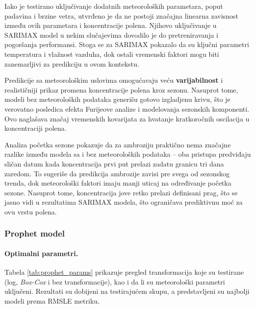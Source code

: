\documentclass[12pt]{article}
\begin{document}
Iako je testirano uključivanje dodatnih meteoroloških parametara, poput padavina i brzine vetra, utvrđeno je da ne postoji značajna linearna zavisnost između ovih parametara i koncentracije polena. Njihovo uključivanje u SARIMAX model u nekim slučajevima dovodilo je do pretreniravanja i pogoršanja performansi. Stoga se za SARIMAX pokazalo da su ključni parametri temperatura i vlažnost vazduha, dok ostali vremenski faktori mogu biti zanemarljivi za predikciju u ovom kontekstu.  

Predikcije sa meteorološkim uslovima omogućavaju veću \textbf{varijabilnost} i realističniji prikaz promena koncentracije polena kroz sezonu. Nasuprot tome, modeli bez meteoroloških podataka generišu gotovo izgladjenu krivu, što je verovatno posledica efekta Furijeove analize i modelovanja sezonskih komponenti. Ovo naglašava značaj vremenskih kovarijata za hvatanje kratkoročnih oscilacija u koncentraciji polena.  

Analiza početka sezone pokazuje da za ambroziju praktično nema značajne razlike između modela sa i bez meteoroloških podataka – oba pristupa predviđaju sličan datum kada koncentracija prvi put prelazi zadatu granicu tri dana zaredom. To sugeriše da predikcija ambrozije zavisi pre svega od sezonskog trenda, dok meteorološki faktori imaju manji uticaj na određivanje početka sezone. Nasuprot tome, koncentracija jove retko prelazi definisani prag, što se jasno vidi u rezultatima SARIMAX modela, što ograničava prediktivnu moć za ovu vrstu polena.  

\subsubsection{Prophet model}
  
\paragraph{\textbf{Optimalni parametri.}}  
Tabela \ref{tab:prophet_params} prikazuje pregled transformacija koje su testirane (log, \textit{Box-Cox} i bez transformacije), kao i da li su meteorološki parametri uključeni. Rezultati su dobijeni na testirajućem skupu, a predstavljeni su najbolji modeli prema RMSLE metriku.  
\end{document}

